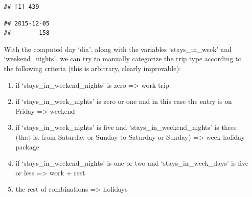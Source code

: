 \documentclass[
]{article}
\newenvironment{Shaded}{\begin{snugshade}}{\end{snugshade}}
\newcommand{\FunctionTok}[1]{\textcolor[rgb]{0.13,0.29,0.53}{\textbf{#1}}}
\newcommand{\NormalTok}[1]{#1}
\newcommand{\SpecialCharTok}[1]{\textcolor[rgb]{0.81,0.36,0.00}{\textbf{#1}}}
\providecommand{\tightlist}{%
  \setlength{\itemsep}{0pt}\setlength{\parskip}{0pt}}
\begin{document}
\begin{verbatim}
## [1] 439
\end{verbatim}

\begin{Shaded}
\end{Shaded}

\begin{verbatim}
## 2015-12-05 
##        158
\end{verbatim}

With the computed day `dia', along with the variables `stays\_in\_week'
and `weekend\_nights', we can try to manually categorize the trip type
according to the following criteria (this is arbitrary, clearly
improvable):

\begin{enumerate}
\def\labelenumi{\arabic{enumi})}
\tightlist
\item
  if `stays\_in\_weekend\_nights' is zero =\textgreater{} work trip
\item
  if `stays\_in\_week\_nights' is zero or one and in this case the entry
  is on Friday =\textgreater{} weekend
\item
  if `stays\_in\_week\_nights' is five and `stays\_in\_weekend\_nights'
  is three (that is, from Saturday or Sunday to Saturday or Sunday)
  =\textgreater{} week holiday package
\item
  if `stays\_in\_weekend\_nights' is one or two and
  `stays\_in\_week\_days' is five or less =\textgreater{} work + rest
\item
  the rest of combinations =\textgreater{} holidays
\end{enumerate}
\end{document}
